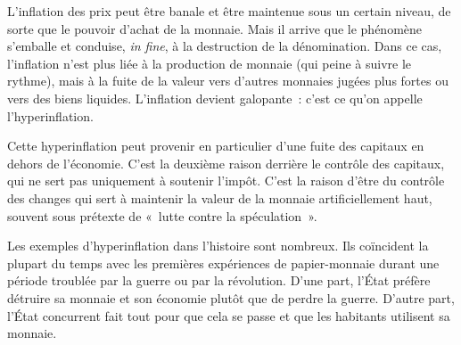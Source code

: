 L'inflation des prix peut être banale et être maintenue sous un certain niveau, de sorte que le pouvoir d'achat de la monnaie. Mais il arrive que le phénomène s'emballe et conduise, \emph{in fine}, à la destruction de la dénomination. Dans ce cas, l'inflation n'est plus liée à la production de monnaie (qui peine à suivre le rythme), mais à la fuite de la valeur vers d'autres monnaies jugées plus fortes ou vers des biens liquides. L'inflation devient galopante~: c'est ce qu'on appelle l'hyperinflation.

Cette hyperinflation peut provenir en particulier d'une fuite des capitaux en dehors de l'économie. C'est la deuxième raison derrière le contrôle des capitaux, qui ne sert pas uniquement à soutenir l'impôt. C'est la raison d'être du contrôle des changes qui sert à maintenir la valeur de la monnaie artificiellement haut, souvent sous prétexte de «~lutte contre la spéculation~». %


Les exemples d'hyperinflation dans l'histoire sont nombreux. Ils coïncident la plupart du temps avec les premières expériences de papier-monnaie durant une période troublée par la guerre ou par la révolution. D'une part, l'État préfère détruire sa monnaie et son économie plutôt que de perdre la guerre. D'autre part, l'État concurrent fait tout pour que cela se passe et que les habitants utilisent sa monnaie.

